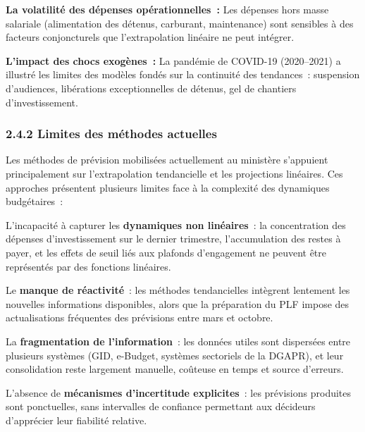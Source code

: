 \textbf{La volatilit\'e des d\'epenses op\'erationnelles~:} Les d\'epenses hors masse salariale (alimentation des d\'etenus, carburant, maintenance) sont sensibles \`a des facteurs conjoncturels que l'extrapolation lin\'eaire ne peut int\'egrer.

\textbf{L'impact des chocs exog\`enes~:} La pand\'emie de COVID-19 (2020--2021) a illustr\'e les limites des mod\`eles fond\'es sur la continuit\'e des tendances~: suspension d'audiences, lib\'erations exceptionnelles de d\'etenus, gel de chantiers d'investissement.

\subsubsection*{2.4.2 \quad Limites des m\'ethodes actuelles}

Les m\'ethodes de pr\'evision mobilis\'ees actuellement au minist\`ere s'appuient principalement sur l'extrapolation tendancielle et les projections lin\'eaires. Ces approches pr\'esentent plusieurs limites face \`a la complexit\'e des dynamiques budg\'etaires~:

L'incapacit\'e \`a capturer les \textbf{dynamiques non lin\'eaires}~: la concentration des d\'epenses d'investissement sur le dernier trimestre, l'accumulation des restes \`a payer, et les effets de seuil li\'es aux plafonds d'engagement ne peuvent \^etre repr\'esent\'es par des fonctions lin\'eaires.

Le \textbf{manque de r\'eactivit\'e}~: les m\'ethodes tendancielles int\`egrent lentement les nouvelles informations disponibles, alors que la pr\'eparation du PLF impose des actualisations fr\'equentes des pr\'evisions entre mars et octobre.

La \textbf{fragmentation de l'information}~: les donn\'ees utiles sont dispers\'ees entre plusieurs syst\`emes (GID, e-Budget, syst\`emes sectoriels de la DGAPR), et leur consolidation reste largement manuelle, co\^uteuse en temps et source d'erreurs.

L'absence de \textbf{m\'ecanismes d'incertitude explicites}~: les pr\'evisions produites sont ponctuelles, sans intervalles de confiance permettant aux d\'ecideurs d'appr\'ecier leur fiabilit\'e relative.

